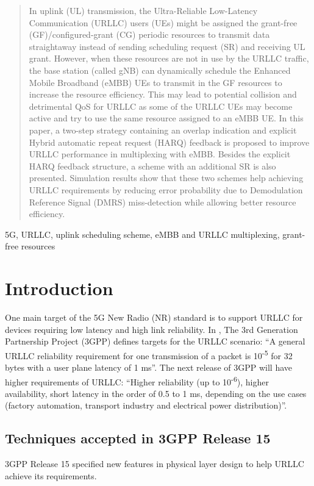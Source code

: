\documentclass[conference]{IEEEtran}
\begin{document}
\begin{abstract}
In uplink (UL) transmission, the Ultra-Reliable Low-Latency Communication (URLLC) users (UEs) might be assigned the grant-free (GF)/configured-grant (CG) periodic resources to transmit data straightaway instead of sending scheduling
request (SR) and receiving UL grant. However, when these resources are not in use by the URLLC traffic, the base station (called gNB) can dynamically schedule the Enhanced Mobile Broadband (eMBB) UEs to transmit in the GF resources to increase the resource efficiency. This may lead to potential collision and detrimental QoS for URLLC as some of the URLLC UEs may become active and try to use the same resource assigned to an eMBB UE. In this paper, a two-step strategy containing an overlap indication and explicit Hybrid automatic repeat request (HARQ) feedback is proposed to improve URLLC performance in multiplexing with eMBB. Besides the explicit HARQ feedback structure, a scheme with an additional SR is also presented. Simulation results show that these two schemes help achieving URLLC requirements by reducing error probability due to Demodulation Reference Signal (DMRS) miss-detection while allowing better resource efficiency.
\end{abstract}

\begin{IEEEkeywords}
5G, URLLC, uplink scheduling scheme, eMBB and URLLC multiplexing, grant-free resources
\end{IEEEkeywords}

\section{Introduction} \label{I}
One main target of the 5G New Radio (NR) standard is to support URLLC for devices requiring low latency and high link reliability. In \cite{b6}, The 3rd Generation Partnership Project (3GPP) defines targets for the URLLC scenario: ``A general URLLC reliability requirement for one transmission of a packet is 10\textsuperscript{-5} for 32 bytes with a user plane latency of 1 ms''. The next release of 3GPP will have higher requirements of URLLC: ``Higher reliability (up to 10\textsuperscript{-6}), higher availability, short latency in the order of 0.5 to 1 ms, depending on the use cases (factory automation, transport industry and electrical power distribution)''\cite{b8}.

\subsection{Techniques accepted in 3GPP Release 15}\label{IAA}
3GPP Release 15 specified new features in physical layer design to help URLLC achieve its requirements.
\end{document}
